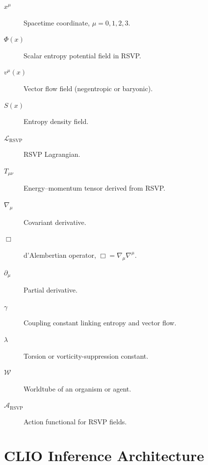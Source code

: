 \documentclass[12pt,oneside]{book}
\theoremstyle{plain}
\theoremstyle{definition}
\begin{document}
\begin{description}

  \item[$x^\mu$] Spacetime coordinate, $\mu = 0,1,2,3$.

  \item[$\Phi(x)$] Scalar entropy potential field in RSVP.

  \item[$v^\mu(x)$] Vector flow field (negentropic or baryonic).

  \item[$S(x)$] Entropy density field.

  \item[$\mathcal{L}_{\mathrm{RSVP}}$] RSVP Lagrangian.

  \item[$T_{\mu\nu}$] Energy--momentum tensor derived from RSVP.

  \item[$\nabla_\mu$] Covariant derivative.

  \item[$\Box$] d’Alembertian operator, $\Box = \nabla_\mu \nabla^\mu$.

  \item[$\partial_\mu$] Partial derivative.

  \item[$\gamma$] Coupling constant linking entropy and vector flow.

  \item[$\lambda$] Torsion or vorticity-suppression constant.

  \item[$\mathcal{W}$] Worldtube of an organism or agent.

  \item[$\mathcal{A}_{\mathrm{RSVP}}$] Action functional for RSVP fields.

\end{description}

\section{CLIO Inference Architecture}
\end{document}
